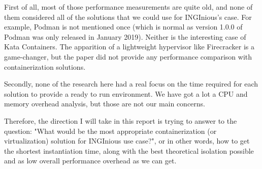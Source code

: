 First of all, most of those performance measurements are quite old, and none of them considered all of the solutions that we could use for INGInious's case.  For example, Podman is not mentioned once (which is normal as version 1.0.0 of Podman was only released in January 2019).  Neither is the interesting case of Kata Containers.  The apparition of a lightweight hypervisor like Firecracker is a game-changer, but the paper did not provide any performance comparison with containerization solutions.

Secondly, none of the research here had a real focus on the time required for each solution to provide a ready to run environment.  We have got a lot a CPU and memory overhead analysis, but those are not our main concerns.

Therefore, the direction I will take in this report is trying to answer to the question: "What would be the most appropriate containerization (or virtualization) solution for INGInious use case?", or in other words, how to get the shortest instantiation time, along with the best theoretical isolation possible and as low overall performance overhead as we can get.
